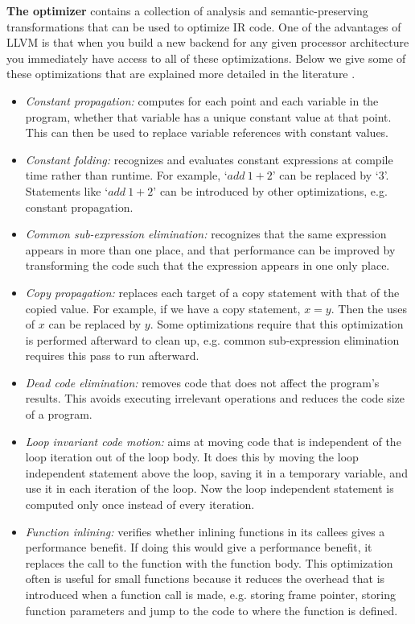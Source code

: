 \textbf{The optimizer} contains a collection of analysis and semantic-preserving transformations that can be used to optimize IR code. One of the advantages of LLVM is that when you build a new backend for any given processor architecture you immediately have access to all of these optimizations. Below we give some of these optimizations that are explained more detailed in the literature \cite[Chapter~9]{dragon_book}.%
\begin{itemize}
\item \emph{Constant propagation:} computes for each point and each variable in the program, whether that variable has a unique constant value at that point. This can then be used to replace variable references with constant values.
\item \emph{Constant folding:} recognizes and evaluates constant expressions at compile time rather than runtime. For example, `$add\ 1+2$' can be replaced by `$3$'. Statements like `$add\ 1+2$' can be introduced by other optimizations, e.g. constant propagation. 
\item \emph{Common sub-expression elimination:} recognizes that the same expression appears in more than one place, and that performance can be improved by transforming the code such that the expression appears in one only place.
\item \emph{Copy propagation:} replaces each target of a copy statement with that of the copied value. For example, if we have a copy statement, $x = y$. Then the uses of $x$ can be replaced by $y$. Some optimizations require that this optimization is performed afterward to clean up, e.g. common sub-expression elimination requires this pass to run afterward. 
\item \emph{Dead code elimination:} removes code that does not affect the program's results. This avoids executing irrelevant operations and reduces the code size of a program.  
\item \emph{Loop invariant code motion:} aims at moving code that is independent of the loop iteration out of the loop body. It does this by moving the loop independent statement above the loop, saving it in a temporary variable, and use it in each iteration of the loop. Now the loop independent statement is computed only once instead of every iteration. 
\item \emph{Function inlining:} verifies whether inlining functions in its callees gives a performance benefit. If doing this would give a performance benefit, it replaces the call to the function with the function body. This optimization often is useful for small functions because it reduces the overhead that is introduced when a function call is made, e.g. storing frame pointer, storing function parameters and jump to the code to where the function is defined.     
\end{itemize}

